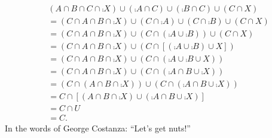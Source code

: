 \documentclass[11pt]{book}
\begin{document}
\begin{enumerate}
\begin{enumerate}
	{\begin{align*}&(A \cap B \cap C \cap \comp{X}) \cup (\comp{A} \cap C) \cup (\comp{B} \cap C) \cup (C \cap X)\\&= (C \cap A \cap B \cap \comp{X}) \cup (C \cap \comp{A}) \cup (C \cap \comp{B}) \cup (C \cap X)\\&= (C \cap A \cap B \cap \comp{X}) \cup (C \cap (\comp{A} \cup \comp{B})) \cup (C \cap X)\\&= (C \cap A \cap B \cap \comp{X}) \cup (C \cap [(\comp{A} \cup \comp{B}) \cup X])\\&= (C \cap A \cap B \cap \comp{X}) \cup (C \cap (\comp{A} \cup \comp{B} \cup X))\\&= (C \cap A \cap B \cap \comp{X}) \cup (C \cap (\comp{A \cap B \cup \comp{X}}))\\&= (C \cap (A \cap B \cap \comp{X})) \cup (C \cap (\comp{A \cap B \cup \comp{X}}))\\&= C \cap [(A \cap B \cap \comp{X}) \cup (\comp{A \cap B \cup \comp{X}})]\\&= C \cap U\\&= C.\end{align*}}\pagebreak
	{In the words of George Costanza: ``Let's get nuts!''
}
\end{enumerate}
\end{enumerate}
\end{document}
